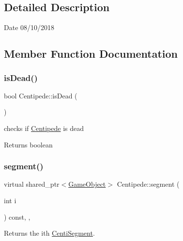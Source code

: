 \subsection{Detailed Description}
\begin{DoxyDate}{Date}
08/10/2018 
\end{DoxyDate}


\subsection{Member Function Documentation}
\mbox{\label{class_centipede_a3d69f0ef4b57cf4b9c1beb1284f2f738}} 
\subsubsection{\texorpdfstring{is\+Dead()}{isDead()}}
{\footnotesize\ttfamily bool Centipede\+::is\+Dead (\begin{DoxyParamCaption}{ }\end{DoxyParamCaption})\hspace{0.3cm}{\ttfamily [inline]}}



checks if \mbox{\hyperlink{class_centipede}{Centipede}} is dead 

\begin{DoxyReturn}{Returns}
boolean 
\end{DoxyReturn}
\mbox{\label{class_centipede_ae722488780d0d19e63510647b5fe108c}} 
\subsubsection{\texorpdfstring{segment()}{segment()}}
{\footnotesize\ttfamily virtual shared\+\_\+ptr$<$\mbox{\hyperlink{class_game_object}{Game\+Object}}$>$ Centipede\+::segment (\begin{DoxyParamCaption}\item[{int}]{i }\end{DoxyParamCaption}) const\hspace{0.3cm}{\ttfamily [inline]}, {\ttfamily [override]}, {\ttfamily [virtual]}}



Returns the ith \mbox{\hyperlink{class_centi_segment}{Centi\+Segment}}. 


